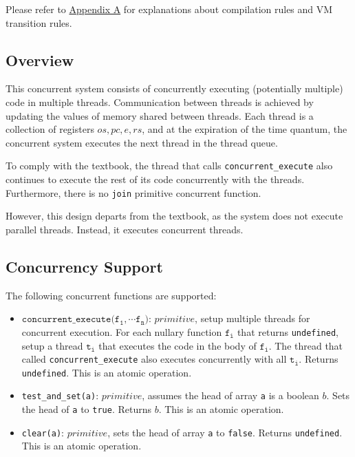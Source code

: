 Please refer to \hyperref[sec:org10e3758]{Appendix A} for explanations about compilation rules and VM transition rules.

\subsection{Overview}
\label{sec:org074ba1b}
This concurrent system consists of concurrently executing (potentially multiple) code in multiple threads. Communication between threads is achieved by updating the values of memory shared between threads. Each thread is a collection of registers \(\textit{os}, \textit{pc}, \textit{e}, \textit{rs}\), and at the expiration of the time quantum, the concurrent system executes the next thread in the thread queue.

To comply with the textbook, the thread that calls \texttt{concurrent\_execute} also continues to execute the rest of its code concurrently with the threads. Furthermore, there is no \texttt{join} primitive concurrent function.

However, this design departs from the textbook, as the system does not execute parallel threads. Instead, it executes concurrent threads.

\subsection{Concurrency Support}
\label{sec:orgaa84fb2}
The following concurrent functions are supported:
\begin{itemize}
\item \(\texttt{concurrent_execute(}\texttt{f}_\texttt{1}, \cdots \texttt{f}_\texttt{n}\texttt{)}\): \(\textit{primitive}\), setup multiple threads for concurrent execution. For each nullary function \(\texttt{f}_\texttt{i}\) that returns \texttt{undefined}, setup a thread \(\texttt{t}_\texttt{i}\) that executes the code in the body of \(\texttt{f}_\texttt{i}\). The thread that called \texttt{concurrent\_execute} also executes concurrently with all \(\texttt{t}_\texttt{i}\). Returns \texttt{undefined}. This is an atomic operation.
\item \texttt{test\_and\_set(a)}: \(\textit{primitive}\), assumes the head of array \texttt{a} is a boolean \(b\). Sets the head of \texttt{a} to \texttt{true}. Returns \(b\). This is an atomic operation.
\item \texttt{clear(a)}: \(\textit{primitive}\), sets the head of array \texttt{a} to \texttt{false}. Returns \texttt{undefined}. This is an atomic operation.
\end{itemize}

